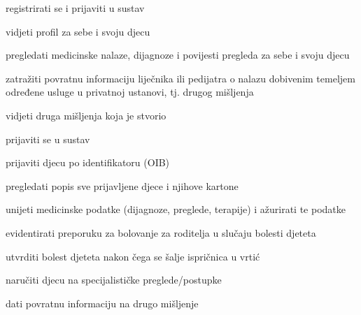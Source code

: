 			
			\begin{packed_enum}
				\item  {}
				
				\begin{packed_enum}
    
					\item registrirati se i prijaviti u sustav
                    \item vidjeti profil za sebe i svoju djecu
					\item pregledati medicinske nalaze, dijagnoze i povijesti pregleda za sebe i svoju djecu
                    \item zatražiti povratnu informaciju liječnika ili pedijatra o nalazu dobivenim temeljem određene usluge u privatnoj ustanovi, tj. drugog mišljenja
                    \item vidjeti druga mišljenja koja je stvorio
                    
				\end{packed_enum}
			
				\item  {}
				
				\begin{packed_enum}
			
					\item prijaviti se u sustav
                    \item prijaviti djecu po identifikatoru (OIB)
                    \item pregledati popis sve prijavljene djece i njihove kartone
					\item unijeti medicinske podatke (dijagnoze, preglede, terapije) i ažurirati te podatke
                    \item evidentirati preporuku za bolovanje za roditelja u slučaju bolesti djeteta
                    \item utvrditi bolest djeteta nakon čega se šalje ispričnica u vrtić
                    \item naručiti djecu na specijalističke preglede/postupke
                    \item dati povratnu informaciju na drugo mišljenje
                
				\end{packed_enum}

                \item  {}
				

\end{packed_enum}
